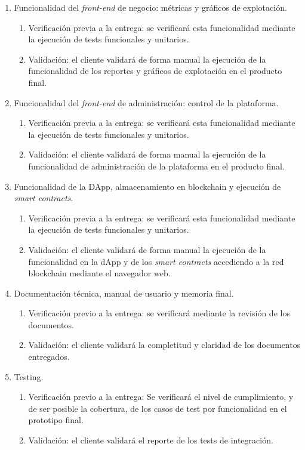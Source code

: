 \documentclass[
11pt, %
]{charter}
\begin{document}
\begin{enumerate}
		\item Funcionalidad del \textit{front-end} de negocio: métricas y gráficos de explotación.
		\begin{enumerate}				
			\item Verificación previa a la entrega: se verificará esta funcionalidad mediante la ejecución de tests funcionales y unitarios.	
			\item Validación: el cliente validará de forma manual la ejecución de la funcionalidad de los reportes y gráficos de explotación en el producto final.			
		\end{enumerate}		
		
		\item Funcionalidad del \textit{front-end} de administración: control de la plataforma.
		\begin{enumerate}				
			\item Verificación previa a la entrega: se verificará esta funcionalidad mediante la ejecución de tests funcionales y unitarios.	
			\item Validación: el cliente validará de forma manual la ejecución de la funcionalidad de administración de la plataforma en el producto final.			
		\end{enumerate}		
	
		\item Funcionalidad de la DApp, almacenamiento en blockchain y ejecución de \textit{smart contracts}.
		\begin{enumerate}				
			\item Verificación previa a la entrega: se verificará esta funcionalidad mediante la ejecución de tests funcionales y unitarios.	
			\item Validación: el cliente validará de forma manual la ejecución de la funcionalidad en la dApp y de los \textit{smart contracts} accediendo a la red blockchain mediante el navegador web.			
		\end{enumerate}			
	
		\item Documentación técnica, manual de usuario y memoria final.
		\begin{enumerate}				
			\item Verificación previo a la entrega: se verificará mediante la revisión de los documentos.			
			\item Validación: el cliente validará la completitud y claridad de los documentos entregados.			
		\end{enumerate}			
		
		\item Testing.
		\begin{enumerate}				
			\item Verificación previo a la entrega: Se verificará el nivel de cumplimiento, y de ser posible la cobertura, de los casos de test por funcionalidad en el prototipo final.
			\item Validación: el cliente validará el reporte de los tests de integración.
		\end{enumerate}			
		
		
\end{enumerate}
\end{document}
